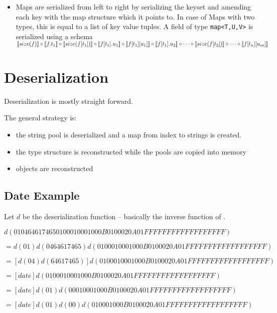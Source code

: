 \begin{itemize}
 \item Maps are serialized from left to right by serializing the keyset and amending each key with the map structure which it points to. In case of Maps with two types, this is equal to a list of key value tuples.
 A field of type \verb/map<T,U,V>/ is serialized using a schema $ \den{size(f)} \circ \den{f.t_1} \circ \den{size(f[t_1])} \circ \den{f[t_1].u_1} \circ \den{f[t_1][u_1]} \circ \den{f[t_1].u_2} \circ \cdots \circ \den{size(f[t_2])} \circ \cdots \circ \den{f[t_n][u_m]}$
\end{itemize}




\section{Deserialization}

Deserialization is mostly straight forward.

The general strategy is:
\begin{itemize}
 \item the string pool is deserialized and a map from index to strings is created.
 \item the type structure is reconstructed while the pools are copied into memory
 \item objects are reconstructed
\end{itemize}

\subsection*{Date Example}

Let $d$ be the deserialization function -- basically the inverse function of \den{\_}.

$d(01 04 64 61  74 65 01 00  01 00 01 00  0B 01 00 02  0A 01 FF FF  FF FF FF FF  FF FF FF)$

$=d(01)d(04 64 61  74 65)d(01 00  01 00 01 00  0B 01 00 02  0A 01 FF FF  FF FF FF FF  FF FF FF)$

$=[d(04) d(64 61  74 65)] d(01 00  01 00 01 00  0B 01 00 02  0A 01 FF FF  FF FF FF FF  FF FF FF)$

$=[date] d(01 00  01 00 01 00  0B 01 00 02  0A 01 FF FF  FF FF FF FF  FF FF FF)$

$=[date] d(01) d(00  01 00 01 00  0B 01 00 02  0A 01 FF FF  FF FF FF FF  FF FF FF)$

$=[date] d(01) d(00) d(01 00 01 00  0B 01 00 02  0A 01 FF FF  FF FF FF FF  FF FF FF)$

